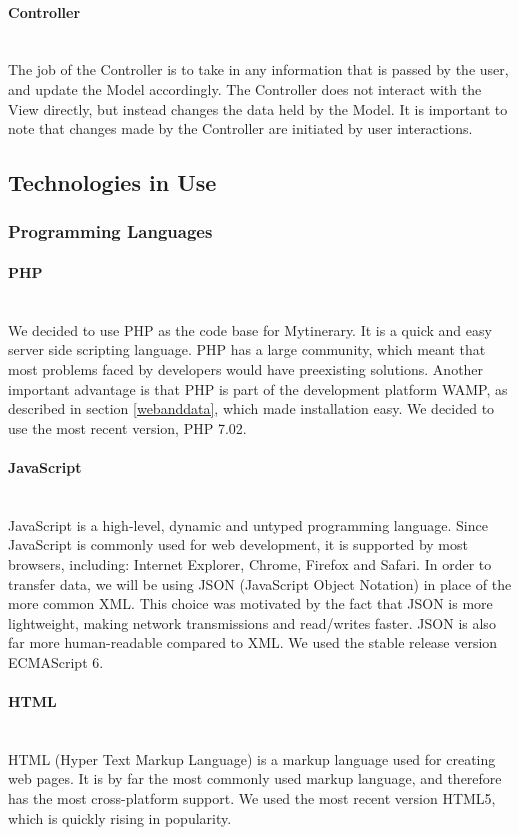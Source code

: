 \documentclass[12pt]{article}
\begin{document}
\paragraph*{Controller}~\\
The job of the Controller is to take in any information that is passed by the user, and update the Model accordingly. The Controller does not interact with the View directly, but instead changes the data held by the Model. It is important to note that changes made by the Controller are initiated by user interactions.
%
\subsection{Technologies in Use} \label{techInUse}
%
%
\subsubsection{Programming Languages} \label{languages}
\paragraph*{PHP}~\\
We decided to use PHP as the code base for Mytinerary. It is a quick and easy server side scripting language. PHP has a large community, which meant that most problems faced by developers would have preexisting solutions. Another important advantage is that PHP is part of the development platform WAMP, as described in section \ref{webanddata}, which made installation easy. We decided to use the most recent version, PHP 7.02.
%
\paragraph*{JavaScript}~\\
JavaScript is a high-level, dynamic and untyped programming language. Since JavaScript is commonly used for web development, it is supported by most browsers, including: Internet Explorer, Chrome, Firefox and Safari. In order to transfer data, we will be using JSON (JavaScript Object Notation) in place of the more common XML. This choice was motivated by the fact that JSON is more lightweight, making network transmissions and read/writes faster. JSON is also far more human-readable compared to XML. We used the stable release version ECMAScript 6.
%
\paragraph*{HTML}~\\
HTML (Hyper Text Markup Language) is a markup language used for creating web pages. It is by far the most commonly used markup language, and therefore has the most cross-platform support. We used the most recent version HTML5, which is quickly rising in popularity. 
%
\end{document}
